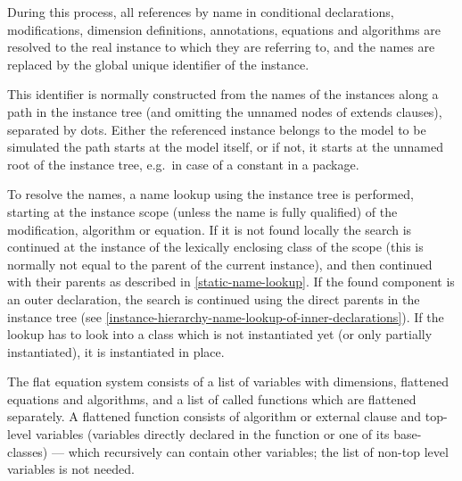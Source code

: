 During this process, all references by name in conditional declarations,
modifications, dimension definitions, annotations, equations and
algorithms are resolved to the real instance to which they are referring
to, and the names are replaced by the global unique identifier of the
instance.

\begin{nonnormative}
This identifier is normally constructed from the names of the instances along a path in the instance tree (and omitting the unnamed nodes of extends clauses), separated
by dots.  Either the referenced instance belongs to the model to be simulated the path starts at the model itself, or if not, it starts at the unnamed root of the instance
tree, e.g.\ in case of a constant in a package.
\end{nonnormative}

\begin{nonnormative}
To resolve the names, a name lookup using the instance tree is performed, starting at the instance scope (unless the name is fully qualified) of the modification, algorithm
or equation.  If it is not found locally the search is continued at the instance of the lexically enclosing class of the scope (this is normally not equal to the parent of
the current instance), and then continued with their parents as described in \cref{static-name-lookup}.  If the found component is an outer declaration, the search is
continued using the direct parents in the instance tree (see \cref{instance-hierarchy-name-lookup-of-inner-declarations}).  If the lookup has to look into a class which
is not instantiated yet (or only partially instantiated), it is instantiated in place.
\end{nonnormative}

The flat equation system consists of a list of variables with dimensions, flattened equations and algorithms, and a list of called functions which are flattened separately.  A flattened function
consists of algorithm or external clause and top-level variables (variables directly declared in the function or one of its base-classes) --- which recursively can contain other variables; the list
of non-top level variables is not needed.

